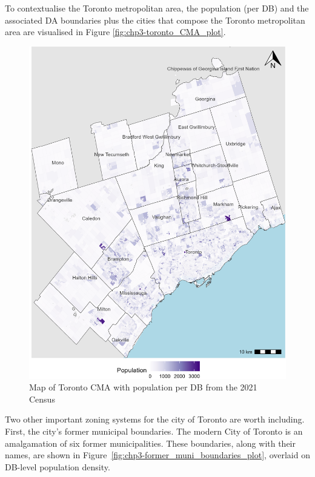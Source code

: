 \documentclass[
11pt, %
oneside, %
english, %
singlespacing, %
]{macthesis} %
\begin{document}
To contextualise the Toronto metropolitan area, the population (per DB) and the associated DA boundaries plus the cities that compose the Toronto metropolitan area are visualised in Figure \ref{fig:chp3-toronto_CMA_plot}.

\begin{figure}

{\centering \includegraphics[width=6in]{./data/figures/chp3-toronto_CMA_plot} 

}

\caption{\label{fig:chp3-toronto_CMA_plot}Map of Toronto CMA with population per DB from the 2021 Census}\label{fig:unnamed-chunk-42}
\end{figure}

Two other important zoning systems for the city of Toronto are worth including. First, the city's former municipal boundaries. The modern City of Toronto is an amalgamation of six former municipalities. These boundaries, along with their names, are shown in Figure~\ref{fig:chp3-former_muni_boundaries_plot}, overlaid on DB-level population density.
\end{document}
